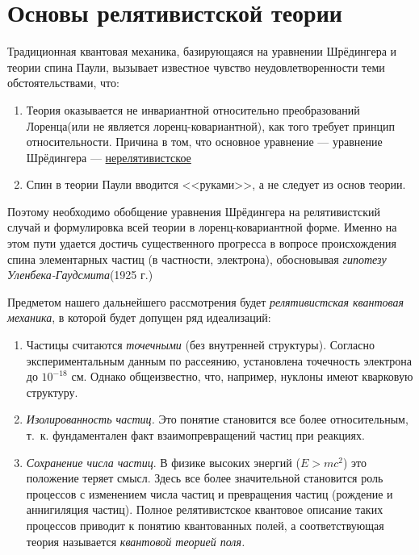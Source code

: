 \chapter{Основы релятивистской теории}

Традиционная квантовая механика, базирующаяся на уравнении Шрёдингера и теории спина Паули, вызывает известное чувство неудовлетворенности теми обстоятельствами, что:

\begin{sloppypar}
\begin{enumerate}
\item{Теория оказывается не инвариантной относительно преобразований Лоренца\footnotemark (или не является лоренц-ковариантной), как того требует принцип относительности. Причина в том, что основное уравнение --- уравнение Шрёдингера --- \underline{нерелятивистское}}
\item{Спин в теории Паули вводится <<руками>>, а не следует из основ теории.}
\end{enumerate}
\end{sloppypar}

Поэтому необходимо обобщение уравнения Шрёдингера на релятивистский случай и формулировка всей теории в лоренц-ковариантной форме. Именно на этом пути удается достичь существенного прогресса в вопросе происхождения спина элементарных частиц (в частности, электрона), обосновывая {\em гипотезу Уленбека-Гаудсмита}\footnotemark (1925 г.)

Предметом нашего дальнейшего рассмотрения будет {\em релятивистская квантовая механика}, в которой будет допущен ряд идеализаций:
\begin{enumerate}
\item{Частицы считаются {\em точечными} (без внутренней структуры). Согласно экспериментальным данным по рассеянию, установлена точечность электрона до $10^{-18}$ см. Однако общеизвестно, что, например, нуклоны имеют кварковую структуру.}

\item{{\em Изолированность частиц.} Это понятие становится все более относительным, т.~к. фундаментален факт взаимопревращений частиц при реакциях.}
\item{{\em Сохранение числа частиц}. В физике высоких энергий (${E > mc^2}$) это положение теряет смысл. Здесь все более значительной становится роль процессов с изменением числа частиц и превращения частиц (рождение и аннигиляция частиц). Полное релятивистское квантовое описание таких процессов приводит к понятию квантованных полей, а соответствующая теория называется {\em квантовой теорией поля.}}
\end{enumerate}

